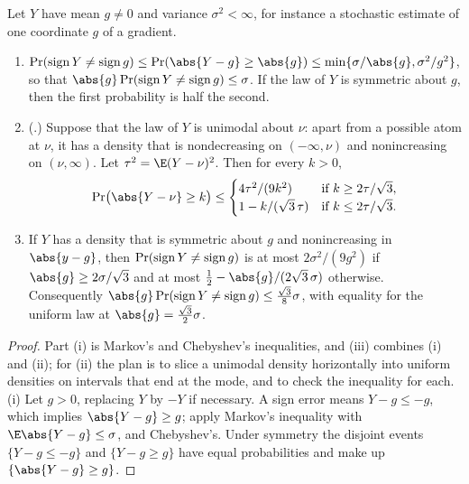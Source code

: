 \begin{refsection}
\begin{lemma}\label{lem:toolkit:gauss}
Let $Y$ have mean $g\ne0$ and variance $\sigma^2<\infty$, for instance a stochastic estimate of one coordinate $g$ of a gradient.
\begin{enumerate}
\item $\Pr(\sign Y\ne\sign g)\le\Pr(\abs{Y-g}\ge\abs{g})\le\min\{\sigma/\abs{g},\sigma^2/g^2\}$, so that $\abs{g}\Pr(\sign Y\ne\sign g)\le\sigma$. If the law of $Y$ is symmetric about $g$, then the first probability is half the second.
\item (.) Suppose that the law of $Y$ is unimodal about $\nu$: apart from a possible atom at $\nu$, it has a density that is nondecreasing on $(-\infty,\nu)$ and nonincreasing on $(\nu,\infty)$. Let $\tau^2=\E(Y-\nu)^2$. Then for every $k>0$,
\[
  \Pr\bigl(\abs{Y-\nu}\ge k\bigr)\le
  \begin{cases}
    4\tau^2/(9k^2) & \text{if }k\ge2\tau/\sqrt3,\\
    1-k/(\sqrt3\,\tau) & \text{if }k\le2\tau/\sqrt3.
  \end{cases}
\]
\item If $Y$ has a density that is symmetric about $g$ and nonincreasing in $\abs{y-g}$, then $\Pr(\operatorname{sign} Y\ne\operatorname{sign} g)$ is at most $2\sigma^2/(9g^2)$ if $\abs{g}\ge2\sigma/\sqrt3$ and at most $\frac12-\abs{g}/(2\sqrt3\,\sigma)$ otherwise. Consequently $\abs{g}\Pr(\sign Y\ne\sign g)\le\frac{\sqrt3}8\sigma$, with equality for the uniform law at $\abs{g}=\frac{\sqrt3}2\sigma$.
\end{enumerate}
\end{lemma}

\begin{proof}
Part (i) is Markov's and Chebyshev's inequalities, and (iii) combines (i) and (ii); for (ii) the plan is to slice a unimodal density horizontally into uniform densities on intervals that end at the mode, and to check the inequality for each. (i) Let $g>0$, replacing $Y$ by $-Y$ if necessary. A sign error means $Y-g\le-g$, which implies $\abs{Y-g}\ge g$; apply Markov's inequality with $\E\abs{Y-g}\le\sigma$, and Chebyshev's. Under symmetry the disjoint events $\{Y-g\le-g\}$ and $\{Y-g\ge g\}$ have equal probabilities and make up $\{\abs{Y-g}\ge g\}$.


\end{proof}
\end{refsection}
